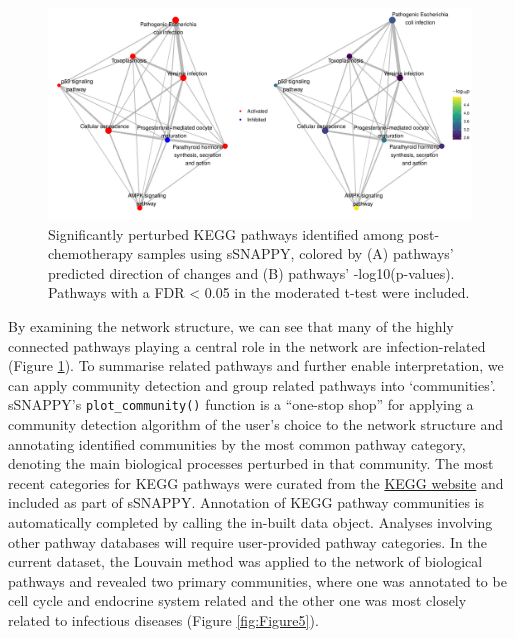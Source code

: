 \documentclass[9pt,a4paper,]{extarticle}
\begin{document}
\begin{figure}

{\centering \includegraphics[width=1\linewidth]{sSNAPPY_paper_files/figure-latex/Figure4-1} 

}

\caption{Significantly perturbed KEGG pathways identified among post-chemotherapy samples using sSNAPPY, colored by (A) pathways’ predicted direction of changes and (B) pathways’ -log10(p-values). Pathways with a FDR < 0.05 in the moderated t-test were included.}\label{fig:Figure4}
\end{figure}

By examining the network structure, we can see that many of the highly connected pathways playing a central role in the network are infection-related (Figure \ref{fig:Figure4}).
To summarise related pathways and further enable interpretation, we can apply community detection\citep{Newman2004} and group related pathways into `communities'.
sSNAPPY's \texttt{plot\_community()} function is a ``one-stop shop'' for applying a community detection algorithm of the user's choice to the network structure and annotating identified communities by the most common pathway category, denoting the main biological processes perturbed in that community.
The most recent categories for KEGG pathways were curated from the \href{https://www.genome.jp/kegg/pathway.html}{KEGG website} and included as part of sSNAPPY.
Annotation of KEGG pathway communities is automatically completed by calling the in-built data object.
Analyses involving other pathway databases will require user-provided pathway categories.
In the current dataset, the Louvain method was applied to the network of biological pathways and revealed two primary communities, where one was annotated to be cell cycle and endocrine system related and the other one was most closely related to infectious diseases (Figure \ref{fig:Figure5}).
\end{document}
